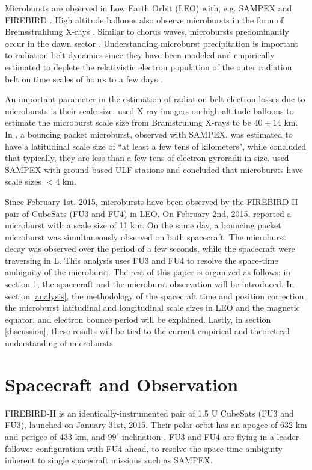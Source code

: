 \documentclass[draft,linenumbers]{agujournal}
\begin{document}
Microbursts are observed in Low Earth Orbit (LEO) with, e.g. SAMPEX \citep{Nakamura95, Nakamura00, Blake96, Lorentzen01a, Lorentzen01b, O'Brien03, O'Brien04, Blum15} and FIREBIRD \citep{Crew16}. High altitude balloons also observe microbursts in the form of Bremsstrahlung X-rays \citep{Parks1967, Woodger15, Anderson2017}. Similar to chorus waves, microbursts predominantly occur in the dawn sector \citep{Lorentzen01b}. Understanding microburst precipitation is important to radiation belt dynamics since they have been modeled and empirically estimated to deplete the relativistic electron population of the outer radiation belt on time scales of hours to a few days \citep{O'Brien04, Thorne05, Shprits07}. 

An important parameter in the estimation of radiation belt electron losses due to microbursts is their scale size. \citet{Parks1967} used X-ray imagers on high altitude balloons to estimate the microburst scale size from Bramstrulung X-rays to be $40 \pm 14$ km. In \citet{Blake96}, a bouncing packet microburst, observed with SAMPEX, was estimated to have a latitudinal scale size of ``at least a few tens of kilometers", while \citet{Blake96} concluded that typically, they are less than a few tens of electron gyroradii in size. \citet{Dietrich10} used SAMPEX with ground-based ULF stations and concluded that microbursts have scale sizes $< 4$ km.

Since February 1st, 2015, microbursts have been observed by the FIREBIRD-II pair of CubeSats (FU3 and FU4) in LEO. On February 2nd, 2015, \citet{Crew16} reported a microburst with a scale size of 11 km. On the same day, a bouncing packet microburst was simultaneously observed on both spacecraft. The microburst decay was observed over the period of a few seconds, while the spacecraft were traversing in L. This analysis uses FU3 and FU4 to resolve the space-time ambiguity of the microburst. The rest of this paper is organized as follows: in section \ref{obs}, the spacecraft and the microburst observation will be introduced. In section \ref{analysis}, the methodology of the spacecraft time and position correction, the microburst latitudinal and longitudinal scale sizes in LEO and the magnetic equator, and electron bounce period will be explained. Lastly, in section \ref{discussion}, these results will be tied to the current empirical and theoretical understanding of microbursts.

\section{Spacecraft and Observation} \label{obs} %
FIREBIRD-II is an identically-instrumented pair of 1.5 U CubeSats (FU3 and FU3), launched on January 31st, 2015. Their polar orbit has an apogee of 632 km and perigee of 433 km, and $99^{\circ}$ inclination \citep{Crew16}. FU3 and FU4 are flying in a leader-follower configuration with FU4 ahead, to resolve the space-time ambiguity inherent to single spacecraft missions such as SAMPEX.
\end{document}
